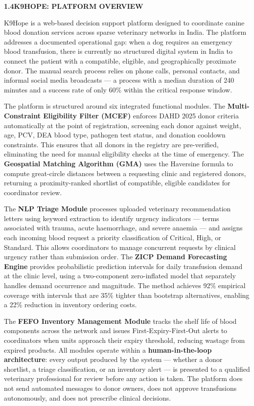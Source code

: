 \documentclass[12pt,a4paper]{article}
\begin{document}
\vspace{2em}
\noindent\textbf{1.4\quad K9HOPE: PLATFORM OVERVIEW}
\vspace{0.8em}

\noindent K9Hope is a web-based decision support platform designed to coordinate canine blood donation services across sparse veterinary networks in India. The platform addresses a documented operational gap: when a dog requires an emergency blood transfusion, there is currently no structured digital system in India to connect the patient with a compatible, eligible, and geographically proximate donor. The manual search process relies on phone calls, personal contacts, and informal social media broadcasts — a process with a median duration of 240 minutes and a success rate of only 60\% within the critical response window.

\noindent The platform is structured around six integrated functional modules. The \textbf{Multi-Constraint Eligibility Filter (MCEF)} enforces DAHD 2025 donor criteria automatically at the point of registration, screening each donor against weight, age, PCV, DEA blood type, pathogen test status, and donation cooldown constraints. This ensures that all donors in the registry are pre-verified, eliminating the need for manual eligibility checks at the time of emergency. The \textbf{Geospatial Matching Algorithm (GMA)} uses the Haversine formula to compute great-circle distances between a requesting clinic and registered donors, returning a proximity-ranked shortlist of compatible, eligible candidates for coordinator review.

\noindent The \textbf{NLP Triage Module} processes uploaded veterinary recommendation letters using keyword extraction to identify urgency indicators — terms associated with trauma, acute haemorrhage, and severe anaemia — and assigns each incoming blood request a priority classification of Critical, High, or Standard. This allows coordinators to manage concurrent requests by clinical urgency rather than submission order. The \textbf{ZICP Demand Forecasting Engine} provides probabilistic prediction intervals for daily transfusion demand at the clinic level, using a two-component zero-inflated model that separately handles demand occurrence and magnitude. The method achieves 92\% empirical coverage with intervals that are 35\% tighter than bootstrap alternatives, enabling a 22\% reduction in inventory ordering costs.

\noindent The \textbf{FEFO Inventory Management Module} tracks the shelf life of blood components across the network and issues First-Expiry-First-Out alerts to coordinators when units approach their expiry threshold, reducing wastage from expired products. All modules operate within a \textbf{human-in-the-loop architecture}: every output produced by the system — whether a donor shortlist, a triage classification, or an inventory alert — is presented to a qualified veterinary professional for review before any action is taken. The platform does not send automated messages to donor owners, does not approve transfusions autonomously, and does not prescribe clinical decisions.
\end{document}
